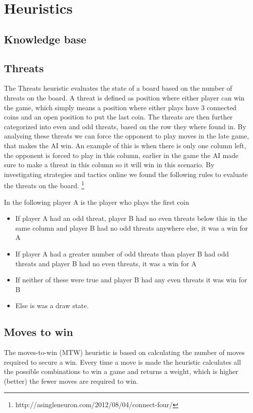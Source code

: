 \documentclass[a4paper, titlepage]{article}
\begin{document}
\section*{Heuristics}
\subsection*{Knowledge base}


\subsection*{Threats}
The Threats heuristic evaluates the state of a board based on the number of
threats on the board. A threat is defined as position where either player can
win the game, which simply means a position where either plays have 3 connected
coins and an open position to put the last coin. The threats are then further
categorized into even and odd threats, based on the row they where found in. By
analysing these threats we can force the opponent to play moves in the late
game, that makes the AI win. An example of this is when there is only one column
left, the opponent is forced to play in this column, earlier in the game the AI
made sure to make a threat in this column so it will win in this scenario. By
investigating strategies and tactics online we found the following rules to
evaluate the threats on the board.
\footnote{http://asingleneuron.com/2012/08/04/connect-four/}

In the following player A is the player who plays the first coin
\begin{itemize} 
	\item If player A had an odd threat, player B had no even threats below this in the same column and player B had no odd threats anywhere else, it was a win for A
	\item If player A had a greater number of odd threats than player B had odd threats and player B had no even threats, it was a win for A	
	\item If neither of these were true and player B had any even threats it was win for B
	\item Else is was a draw state.
\end{itemize} 

\subsection*{Moves to win}
The moves-to-win (MTW) heuristic is based on calculating the number of moves required to 
secure a win. Every time a move is made the heuristic calculates all the possible 
combinations to win a game and returns a weight, which is higher (better) the fewer
moves are required to win. 
\end{document}

